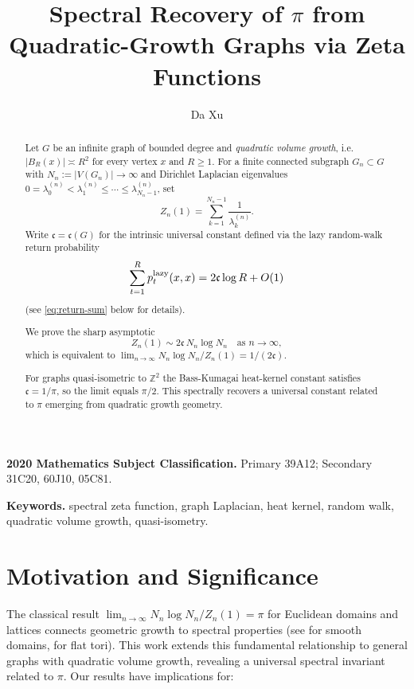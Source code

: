 \documentclass[11pt]{amsart}
\title{Spectral Recovery of $\pi$ from Quadratic-Growth Graphs via Zeta Functions}
\author{Da Xu}
\date{}
\theoremstyle{remark}
\newcommand{\cG}{\mathfrak{c}}      %
\begin{document}
\begin{abstract}
Let $G$ be an infinite graph of bounded degree and
\emph{quadratic volume growth}, i.e.\ $|B_R(x)|\asymp R^{2}$ for every
vertex $x$ and $R\ge1$.
For a finite connected subgraph $G_n\subset G$ with
$N_n:=|V(G_n)|\to\infty$ and Dirichlet Laplacian eigenvalues
$0=\lambda^{(n)}_{0}<\lambda^{(n)}_{1}\le\cdots\le\lambda^{(n)}_{N_n-1}$,
set
\[
  Z_n(1)=\sum_{k=1}^{N_n-1}\frac1{\lambda^{(n)}_{k}}.
\]
Write $\cG=\cG(G)$ for the intrinsic universal constant defined via the lazy
random-walk return probability
\begin{equation}
    \sum_{t=1}^{R}p_{t}^{\textnormal{lazy}}(x,x)=2\cG\log R+O(1) \label{eq:return-sum-abstract}
\end{equation}
(see \eqref{eq:return-sum} below for details).

We prove the sharp asymptotic
\[
  Z_n(1) \sim 2\cG\,N_n\log N_n \quad\text{as } n\to\infty,
\]
which is equivalent to \(\lim_{n\to\infty} N_n\log N_n / Z_n(1) = 1/(2\cG)\).

For graphs quasi-isometric to $\mathbb Z^{2}$ the Bass-Kumagai heat-kernel constant satisfies $\cG=1/\pi$, so the limit equals $\pi/2$. This spectrally recovers a universal constant related to $\pi$ emerging from quadratic growth geometry.
\end{abstract}

\maketitle

\bigskip\noindent \textbf{2020 Mathematics Subject Classification.} Primary 39A12; Secondary 31C20, 60J10, 05C81.

\noindent \textbf{Keywords.} spectral zeta function, graph Laplacian, heat kernel, random walk, quadratic volume growth, quasi-isometry.

\section{Motivation and Significance}

The classical result $\lim_{n\to\infty} N_n\log N_n/Z_n(1) = \pi$ for Euclidean domains 
and lattices connects geometric growth to spectral properties (see 
\cite{Colin85} for smooth domains, \cite{Frank10} for flat tori). This work extends this 
fundamental relationship to general graphs with quadratic volume growth, revealing 
a universal spectral invariant related to $\pi$. Our results have implications for:
\end{document}
